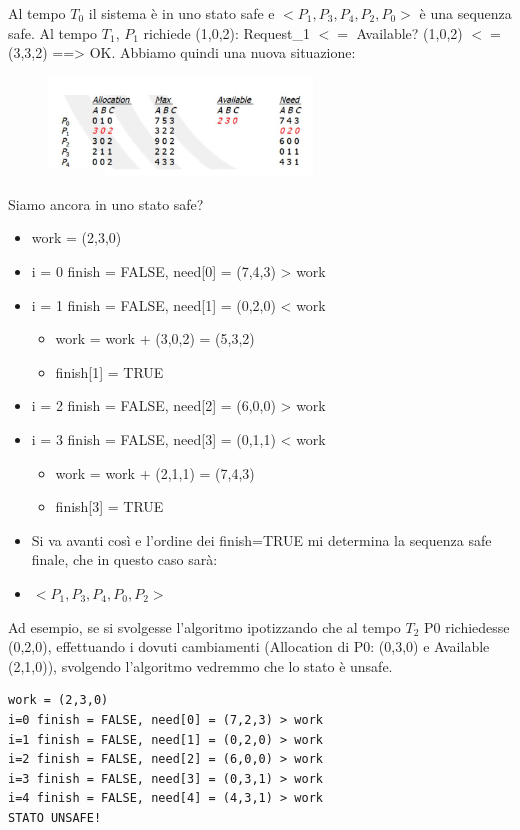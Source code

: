 \documentclass[a4paper]{article}
\begin{document}
Al tempo $T_0$ il sistema è in uno stato safe e $<P_1, P_3, P_4, P_2, P_0>$ è una sequenza safe. \newline
Al tempo $T_1$, $P_1$ richiede (1,0,2): Request\_1 $<=$ Available? (1,0,2) $<=$ (3,3,2) ==> OK. Abbiamo quindi una nuova situazione:
\begin{figure}[htb]
    \includegraphics[width=7cm]{img/bank1.JPG}
\end{figure}

Siamo ancora in uno stato safe?
\begin{itemize}
    \item work = (2,3,0)
    \item i = 0 finish = FALSE, need[0] = (7,4,3) > work
    \item i = 1 finish = FALSE, need[1] = (0,2,0) < work
          \begin{itemize}
              \item work = work + (3,0,2) = (5,3,2)
              \item finish[1] = TRUE
          \end{itemize}
    \item i = 2 finish = FALSE, need[2] = (6,0,0) > work
    \item i = 3 finish = FALSE, need[3] = (0,1,1) < work
          \begin{itemize}
              \item work = work + (2,1,1) = (7,4,3)
              \item finish[3] = TRUE
          \end{itemize}
    \item Si va avanti così e l'ordine dei finish=TRUE mi determina la sequenza safe finale, che in questo caso sarà:
    \item $<P_1, P_3, P_4, P_0, P_2>$
\end{itemize}

Ad esempio, se si svolgesse l'algoritmo ipotizzando che al tempo $T_2$ P0 richiedesse (0,2,0), effettuando i dovuti cambiamenti (Allocation di P0: (0,3,0) e Available (2,1,0)), svolgendo l'algoritmo vedremmo che lo stato è unsafe.
\begin{Verbatim}
work = (2,3,0)
i=0 finish = FALSE, need[0] = (7,2,3) > work
i=1 finish = FALSE, need[1] = (0,2,0) > work
i=2 finish = FALSE, need[2] = (6,0,0) > work
i=3 finish = FALSE, need[3] = (0,3,1) > work
i=4 finish = FALSE, need[4] = (4,3,1) > work
STATO UNSAFE!
\end{Verbatim}
\end{document}
